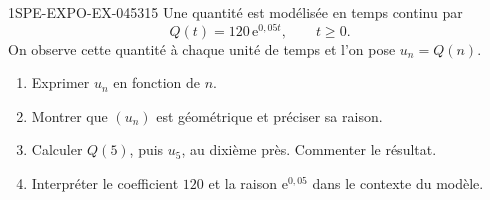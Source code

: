 \begin{exercice}{1SPE-EXPO-EX-045}{3}{15}
Une quantité est modélisée en temps continu par
\[Q(t)=120\,\mathrm{e}^{0{,}05t},\qquad t\geq 0.\]
On observe cette quantité à chaque unité de temps et l'on pose $u_n=Q(n)$.

\begin{enumerate}
\item Exprimer $u_n$ en fonction de $n$.
\item Montrer que $(u_n)$ est géométrique et préciser sa raison.
\item Calculer $Q(5)$, puis $u_5$, au dixième près. Commenter le résultat.
\item Interpréter le coefficient $120$ et la raison $\mathrm{e}^{0{,}05}$ dans le contexte du modèle.
\end{enumerate}
\end{exercice}
